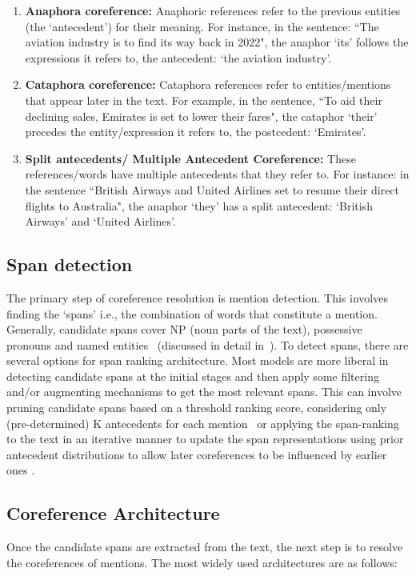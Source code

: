 \begin{enumerate}
    \item \textbf{Anaphora coreference: }
    Anaphoric references refer to the previous entities (the `antecedent') for their meaning. For instance, in the sentence: ``The aviation industry is to find its way back in 2022", the anaphor `its' follows the expressions it refers to, the antecedent: `the aviation industry'. 
    
    \item \textbf{Cataphora coreference:}
    Cataphora references refer to entities/mentions that appear later in the text. For example, in the sentence, ``To aid their declining sales, Emirates is set to lower their fares", the cataphor `their' precedes the entity/expression it refers to, the postcedent: `Emirates'. 
    
    \item \textbf{Split antecedents/ Multiple Antecedent Coreference:}
    These references/words have multiple antecedents that they refer to. For instance: in the sentence ``British Airways and United Airlines set to resume their direct flights to Australia", the anaphor `they' has a split antecedent: `British Airways' and `United Airlines'. 
\end{enumerate}

\subsection{Span detection}

The primary step of coreference resolution is mention detection. This involves finding the `spans' i.e., the combination of words that constitute a mention. Generally, candidate spans cover NP (noun parts of the text), possessive pronouns and named entities~\cite{stanfordcoref} (discussed in detail in~). To detect spans, there are several options for span ranking architecture. Most models are more liberal in detecting candidate spans at the initial stages and then apply some filtering and/or augmenting mechanisms to get the most relevant spans. This can involve pruning candidate spans based on a threshold ranking score, considering only (pre-determined) K antecedents for each mention~\cite{lee2018coursetofine} or applying the span-ranking to the text in an iterative manner to update the span representations using prior antecedent distributions to allow later coreferences to be influenced by earlier ones \cite{lee2018coursetofine}. 


\subsection{Coreference Architecture}
Once the candidate spans are extracted from the text, the next step is to resolve the coreferences of mentions. The most widely used architectures are as follows: 

